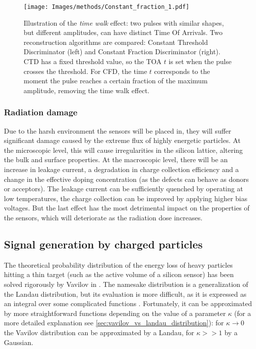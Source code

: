 \begin{figure}[h!btp]
    \centering
    \texttt{[image: Images/methods/Constant\_fraction\_1.pdf]}
    \captionsetup{width=\captionwidth}
    \caption{Illustration of the \textit{time walk} effect: two pulses with similar shapes, but different amplitudes, can have distinct Time Of Arrivals. Two reconstruction algorithms are compared: Constant Threshold Discriminator (left) and Constant Fraction Discriminator (right). CTD has a fixed threshold value, so the TOA \(t\) is set when the pulse crosses the threshold. For CFD, the time \(t\) corresponds to the moment the pulse reaches a certain fraction of the maximum amplitude, removing the time walk effect.}
    \label{fig:constant fraction}
\end{figure} 


\subsubsection{Radiation damage}

Due to the harsh environment the sensors will be placed in, they will suffer significant damage caused by the extreme flux of highly energetic particles. At the microscopic level, this will cause irregularities in the silicon lattice, altering the bulk and surface properties. At the macroscopic level, there will be an increase in leakage current, a degradation in charge collection efficiency and a change in the effective doping concentration \cite{Moll:1999kv} (as the defects can behave as donors or acceptors). The leakage current can be sufficiently quenched by operating at low temperatures, the charge collection can be improved by applying higher bias voltages. But the last effect has the most detrimental impact on the properties of the sensors, which will deteriorate as the radiation dose increases.


\subsection{Signal generation by charged particles}\label{subsec:charged_particles_distribution}
The theoretical probability distribution of the energy loss of heavy particles hitting a thin target (such as the active volume of a silicon sensor) has been solved rigorously by Vavilov in \cite{vavilov_1957}. The namesake distribution is a generalization of the Landau distribution, but its evaluation is more difficult, as it is expressed as an integral over some complicated functions \cite[Eq.(4)]{vavilov_1957}. Fortunately, it can be approximated by more straightforward functions depending on the value of a parameter \(\kappa\) (for a more detailed explanation see \ref{sec:vavilov_vs_landau_distribution}): for \(\kappa\rightarrow0\) the Vavilov distribution can be approximated by a Landau, for \(\kappa>>1\) by a Gaussian.

